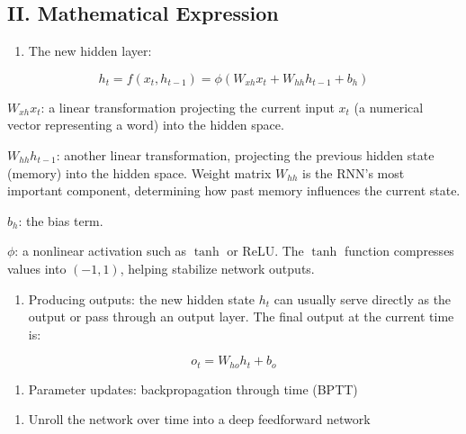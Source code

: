 \hypertarget{ii.-mathematical-expression}{%
\subsection{II. Mathematical Expression}\label{ii.-mathematical-expression}}

\begin{enumerate}
\def\labelenumi{\arabic{enumi}.}
\tightlist
\item
{}
  The new hidden layer:
\end{enumerate}

\[
h_t=f(x_t,h_{t-1})=\phi(W_{xh}x_t+W_{hh}h_{t-1}+b_h)
\]

\(W_{xh}x_t\): a linear transformation projecting the current input \(x_t\) (a numerical vector representing a word) into the hidden space.

\(W_{hh}h_{t-1}\): another linear transformation, projecting the previous hidden state (memory) into the hidden space. Weight matrix \(W_{hh}\) is the RNN's most important component, determining how past memory influences the current state.

\(b_h\): the bias term.

\(\phi\): a nonlinear activation such as \(\tanh\) or ReLU. The \(\tanh\) function compresses values into \((-1,1)\), helping stabilize network outputs.

\begin{enumerate}
\def\labelenumi{\arabic{enumi}.}
\setcounter{enumi}{1}
\tightlist
\item
{}
  Producing outputs: the new hidden state \(h_t\) can usually serve directly as the output or pass through an output layer. The final output at the current time is:
\end{enumerate}

\[
o_t=W_{ho}h_t+b_o
\]

\begin{enumerate}
\def\labelenumi{\arabic{enumi}.}
\setcounter{enumi}{2}
\tightlist
\item
  Parameter updates: backpropagation through time (BPTT)
\end{enumerate}

\begin{enumerate}
\def\labelenumi{(\arabic{enumi})}
\tightlist
\item
  Unroll the network over time into a deep feedforward network
\end{enumerate}

